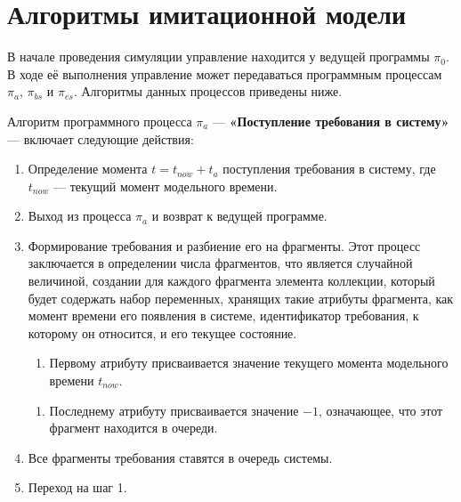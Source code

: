 \documentclass[bachelor, och, pract, times]{SCWorks}
\begin{document}

\section{Алгоритмы имитационной модели}

В начале проведения симуляции управление находится у ведущей программы $\pi_0$. В ходе её выполнения управление может передаваться программным процессам $\pi_a$, $\pi_{bs}$ и $\pi_{es}$. Алгоритмы данных процессов приведены ниже.  

Алгоритм программного процесса $\pi_a$ — \textbf{«Поступление требования в систему»} — включает следующие действия:
    \begin{enumerate}
        \item Определение момента $t = t_{now} + t_a$ поступления требования в систему, где $t_{now}$ — текущий момент модельного времени.
        \item Выход из процесса $\pi_a$ и возврат к ведущей программе.
        \item Формирование требования и разбиение его на фрагменты. Этот процесс заключается в определении числа фрагментов, что является случайной величиной, создании для каждого фрагмента элемента коллекции, который будет содержать набор переменных, хранящих такие атрибуты фрагмента, как момент времени его появления в системе, идентификатор требования, к которому он относится, и его текущее состояние.
        \begin{enumerate}
            \item Первому атрибуту присваивается значение текущего момента модельного времени $t_{now}$.
        \end{enumerate}
        \begin{enumerate}
            \item Последнему атрибуту присваивается значение $-1$, означающее, что этот фрагмент находится в очереди.
        \end{enumerate}
        \item Все фрагменты требования ставятся в очередь системы.
        \item Переход на шаг 1.
    \end{enumerate}
\end{document}
